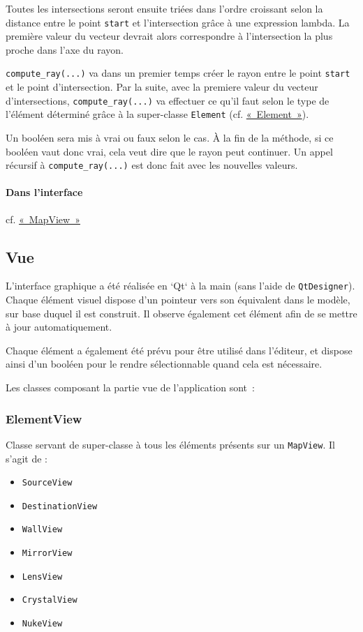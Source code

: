 \documentclass[]{report}
\begin{document}
Toutes les intersections seront ensuite triées dans l'ordre croissant selon la distance entre le point \texttt{start} et
l'intersection grâce à une expression lambda.
La première valeur du vecteur devrait alors correspondre à l'intersection la plus proche dans l'axe du rayon.

\texttt{compute\_ray(...)} va dans un premier temps créer le rayon entre le point \texttt{start} et le point d'intersection.
Par la suite, avec la premiere valeur du vecteur d'intersections, 
\texttt{compute\_ray(...)} va effectuer ce qu'il faut selon le type de l'élément déterminé 
grâce à la super-classe \texttt{Element} (cf. \hyperref[Element]{«~Element~»}).

Un booléen sera mis à vrai ou faux selon le cas. À la fin de la méthode, si ce booléen vaut donc vrai, cela veut dire
que le rayon peut continuer. Un appel récursif à \texttt{compute\_ray(...)} est donc fait avec les nouvelles valeurs. 

\paragraph{Dans l'interface} cf. \hyperref[MapView]{«~MapView~»}    

\subsection{Vue}

L’interface graphique a été réalisée en `Qt` à la main (sans l'aide de \texttt{QtDesigner}).
Chaque élément visuel dispose d’un pointeur vers son
équivalent dans le modèle, sur base duquel il est construit. Il observe également cet élément afin de se mettre
à jour automatiquement.

Chaque élément a également été prévu pour être utilisé dans l’éditeur, et dispose ainsi d’un booléen pour le rendre 
sélectionnable quand cela est nécessaire.

Les classes composant la partie vue de l’application sont~:

\subsubsection{ElementView}

Classe servant de super-classe à tous les éléments présents sur un \texttt{MapView}.
Il s'agit de :

\begin{itemize}
    \item \texttt{SourceView}
    \item \texttt{DestinationView}
    \item \texttt{WallView}
    \item \texttt{MirrorView}
    \item \texttt{LensView}
    \item \texttt{CrystalView}
    \item \texttt{NukeView}
\end{itemize}
\end{document}
